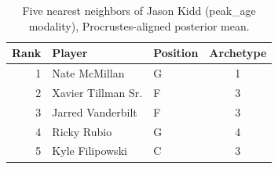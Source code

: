 \begin{table}[htbp]
  \centering\small
  \begin{tabular}{rllc}
    \toprule
    Rank & Player & Position & Archetype \\
    \midrule
    1 & Nate McMillan & G & 1 \\
    2 & Xavier Tillman Sr. & F & 3 \\
    3 & Jarred Vanderbilt & F & 3 \\
    4 & Ricky Rubio & G & 4 \\
    5 & Kyle Filipowski & C & 3 \\
    \bottomrule
  \end{tabular}
  \caption{Five nearest neighbors of Jason Kidd (peak_age modality), Procrustes-aligned posterior mean.}
  \label{tab:Jason_Kidd_neighbors_peak_age}
\end{table}

